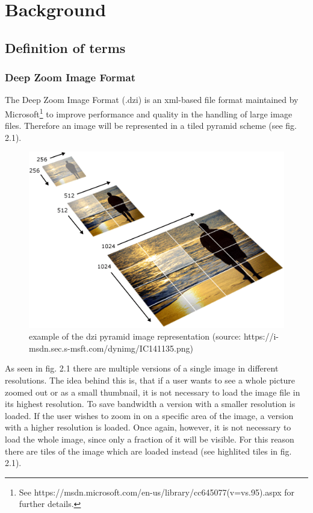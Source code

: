 \chapter{Background}
	\section{Definition of terms}
		\subsection{Deep Zoom Image Format}
			The Deep Zoom Image Format (.dzi) is an
			xml-based file format maintained by Microsoft\footnote{See
			https://msdn.microsoft.com/en-us/library/cc645077(v=vs.95).aspx for further
			details.} to improve performance and quality in the handling of large image
			files. Therefore an image will be represented in a tiled pyramid scheme (see
			fig. 2.1).
			
			\begin{figure}[!htbp]
				\begin{center}
					\includegraphics[scale=0.5]{img/dzi_pyramid.png}
					\caption{example of the dzi pyramid image representation (source:
					https://i-msdn.sec.s-msft.com/dynimg/IC141135.png)}
					\label{fig:abb2.1}
				\end{center}
			\end{figure}

			As seen in fig. 2.1 there are multiple versions of a single image in
			different resolutions. The idea behind this is, that if a user wants to see a
			whole picture zoomed out or as a small thumbnail, it is not necessary to
			load the image file in its highest resolution. To save bandwidth a version
			with a smaller resolution is loaded. If the user wishes to zoom in on a
			specific area of the image, a version with a higher resolution is loaded.
			Once again, however, it is not necessary to load the whole image, since only
			a fraction of it will be visible. For this reason there are tiles of the
			image which are loaded instead (see highlited tiles in fig. 2.1).
			
